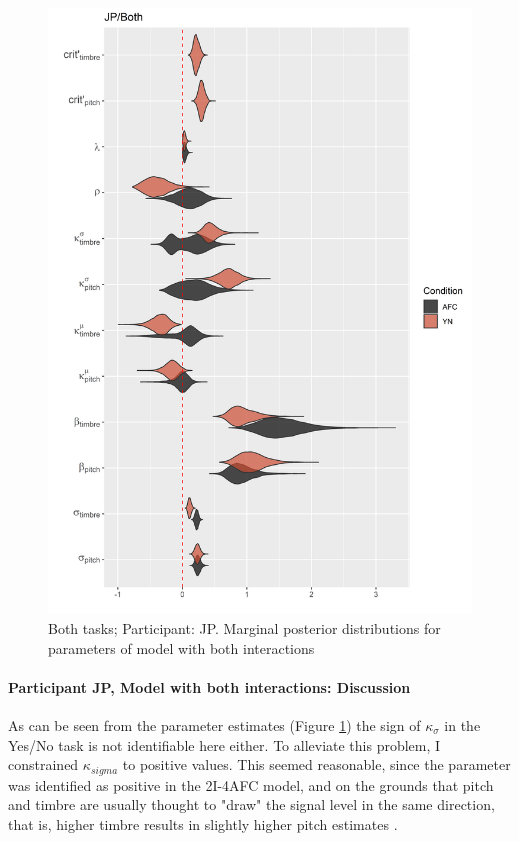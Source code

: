 \documentclass{article}\usepackage{knitr}
\begin{document}
\begin{figure}[H]
\centering
\includegraphics[scale=0.75, angle = 0]{Analysis_of_Human_Data/JP_YN_AFC_Both}
\caption{Both tasks; Participant: JP. Marginal posterior distributions for parameters of model with both interactions}
\label{fig:JP_YN_AFC_Both}
\end{figure}

\paragraph{Participant JP, Model with both interactions: Discussion}

As can be seen from the parameter estimates (Figure \ref{fig:JP_YN_AFC_Both}) the sign of $\kappa_{\sigma}$ in the Yes/No task is not identifiable here either. To alleviate this problem, I constrained $\kappa_{sigma}$ to positive values. This seemed reasonable, since the parameter was identified as positive in the 2I-4AFC model, and on the grounds that pitch and timbre are usually thought to "draw" the signal level in the same direction, that is, higher timbre results in slightly higher pitch estimates \citep{platt1985}.
\end{document}
